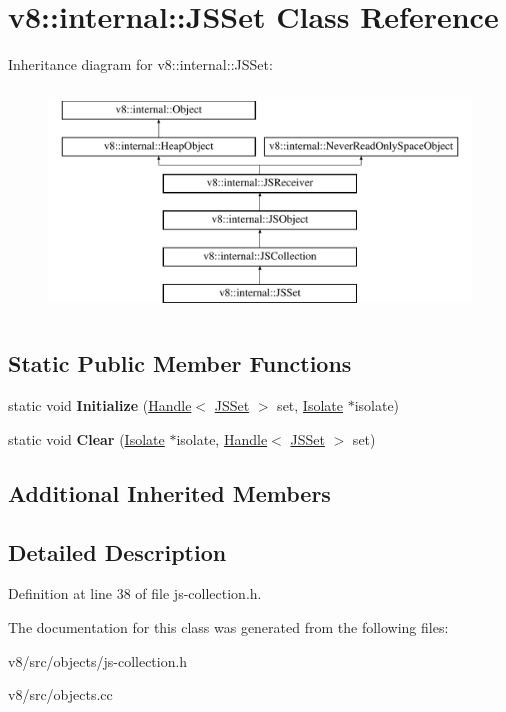 \hypertarget{classv8_1_1internal_1_1JSSet}{}\section{v8\+:\+:internal\+:\+:J\+S\+Set Class Reference}
\label{classv8_1_1internal_1_1JSSet}
Inheritance diagram for v8\+:\+:internal\+:\+:J\+S\+Set\+:\begin{figure}[H]
\begin{center}
\leavevmode
\includegraphics[height=6.000000cm]{classv8_1_1internal_1_1JSSet}
\end{center}
\end{figure}
\subsection*{Static Public Member Functions}
\begin{DoxyCompactItemize}
\item 
\mbox{\label{classv8_1_1internal_1_1JSSet_a9919901ec14e21383c23a9f05e4890f5}} 
static void {\bfseries Initialize} (\mbox{\hyperlink{classv8_1_1internal_1_1Handle}{Handle}}$<$ \mbox{\hyperlink{classv8_1_1internal_1_1JSSet}{J\+S\+Set}} $>$ set, \mbox{\hyperlink{classv8_1_1internal_1_1Isolate}{Isolate}} $\ast$isolate)
\item 
\mbox{\label{classv8_1_1internal_1_1JSSet_ac74e2112b4ee9f36230706ff99157d3e}} 
static void {\bfseries Clear} (\mbox{\hyperlink{classv8_1_1internal_1_1Isolate}{Isolate}} $\ast$isolate, \mbox{\hyperlink{classv8_1_1internal_1_1Handle}{Handle}}$<$ \mbox{\hyperlink{classv8_1_1internal_1_1JSSet}{J\+S\+Set}} $>$ set)
\end{DoxyCompactItemize}
\subsection*{Additional Inherited Members}


\subsection{Detailed Description}


Definition at line 38 of file js-\/collection.\+h.



The documentation for this class was generated from the following files\+:\begin{DoxyCompactItemize}
\item 
v8/src/objects/js-\/collection.\+h\item 
v8/src/objects.\+cc\end{DoxyCompactItemize}
